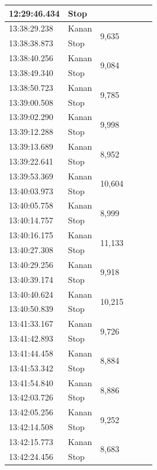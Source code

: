 \begin{longtable}{|l|l|l|l|l|l|}
  \cline{1-2}
  12:29:46.434 & Stop & \\
  \hline
  13:38:29.238 & Kanan & \multirow{2}{*}{9,635} \\
  \cline{1-2}
  13:38:38.873 & Stop & \\
  \hline
  13:38:40.256 & Kanan & \multirow{2}{*}{9,084} \\
  \cline{1-2}
  13:38:49.340 & Stop & \\
  \hline
  13:38:50.723 & Kanan & \multirow{2}{*}{9,785} \\
  \cline{1-2}
  13:39:00.508 & Stop & \\
  \hline
  13:39:02.290 & Kanan & \multirow{2}{*}{9,998} \\
  \cline{1-2}
  13:39:12.288 & Stop & \\
  \hline
  13:39:13.689 & Kanan & \multirow{2}{*}{8,952} \\
  \cline{1-2}
  13:39:22.641 & Stop & \\
  \hline
  13:39:53.369 & Kanan & \multirow{2}{*}{10,604} \\
  \cline{1-2}
  13:40:03.973 & Stop & \\
  \hline
  13:40:05.758 & Kanan & \multirow{2}{*}{8,999} \\
  \cline{1-2}
  13:40:14.757 & Stop & \\
  \hline
  13:40:16.175 & Kanan & \multirow{2}{*}{11,133} \\
  \cline{1-2}
  13:40:27.308 & Stop & \\
  \hline
  13:40:29.256 & Kanan & \multirow{2}{*}{9,918} \\
  \cline{1-2}
  13:40:39.174 & Stop & \\
  \hline
  13:40:40.624 & Kanan & \multirow{2}{*}{10,215} \\
  \cline{1-2}
  13:40:50.839 & Stop & \\
  \hline
  13:41:33.167 & Kanan & \multirow{2}{*}{9,726} \\
  \cline{1-2}
  13:41:42.893 & Stop & \\
  \hline
  13:41:44.458 & Kanan & \multirow{2}{*}{8,884} \\
  \cline{1-2}
  13:41:53.342 & Stop & \\
  \hline
  13:41:54.840 & Kanan & \multirow{2}{*}{8,886} \\
  \cline{1-2}
  13:42:03.726 & Stop & \\
  \hline
  13:42:05.256 & Kanan & \multirow{2}{*}{9,252} \\
  \cline{1-2}
  13:42:14.508 & Stop & \\
  \hline
  13:42:15.773 & Kanan & \multirow{2}{*}{8,683} \\
  \cline{1-2}
  13:42:24.456 & Stop & \\
  \hline
  \end{longtable}


